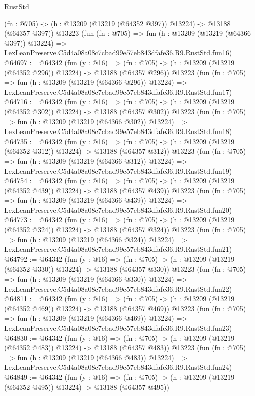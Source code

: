 \begin{lexlean}{RustStd}
\begin{coremodule}
    (fn : @705) -> (h : @13209 (@13219 (@64352 @397)) @13224) -> @13188 (@64357 @397))
    @13223
    (fun (fn : @705) =>
    fun (h : @13209 (@13219 (@64366 @397)) @13224) =>
    LexLeanPreserve.C5d4a08a08c7cbad99e57eb843dfafe36.R9.RustStd.fun16)
@64697 := @64342
    (fun (y : @16) =>
    (fn : @705) -> (h : @13209 (@13219 (@64352 @296)) @13224) -> @13188 (@64357 @296))
    @13223
    (fun (fn : @705) =>
    fun (h : @13209 (@13219 (@64366 @296)) @13224) =>
    LexLeanPreserve.C5d4a08a08c7cbad99e57eb843dfafe36.R9.RustStd.fun17)
@64716 := @64342
    (fun (y : @16) =>
    (fn : @705) -> (h : @13209 (@13219 (@64352 @302)) @13224) -> @13188 (@64357 @302))
    @13223
    (fun (fn : @705) =>
    fun (h : @13209 (@13219 (@64366 @302)) @13224) =>
    LexLeanPreserve.C5d4a08a08c7cbad99e57eb843dfafe36.R9.RustStd.fun18)
@64735 := @64342
    (fun (y : @16) =>
    (fn : @705) -> (h : @13209 (@13219 (@64352 @312)) @13224) -> @13188 (@64357 @312))
    @13223
    (fun (fn : @705) =>
    fun (h : @13209 (@13219 (@64366 @312)) @13224) =>
    LexLeanPreserve.C5d4a08a08c7cbad99e57eb843dfafe36.R9.RustStd.fun19)
@64754 := @64342
    (fun (y : @16) =>
    (fn : @705) -> (h : @13209 (@13219 (@64352 @439)) @13224) -> @13188 (@64357 @439))
    @13223
    (fun (fn : @705) =>
    fun (h : @13209 (@13219 (@64366 @439)) @13224) =>
    LexLeanPreserve.C5d4a08a08c7cbad99e57eb843dfafe36.R9.RustStd.fun20)
@64773 := @64342
    (fun (y : @16) =>
    (fn : @705) -> (h : @13209 (@13219 (@64352 @324)) @13224) -> @13188 (@64357 @324))
    @13223
    (fun (fn : @705) =>
    fun (h : @13209 (@13219 (@64366 @324)) @13224) =>
    LexLeanPreserve.C5d4a08a08c7cbad99e57eb843dfafe36.R9.RustStd.fun21)
@64792 := @64342
    (fun (y : @16) =>
    (fn : @705) -> (h : @13209 (@13219 (@64352 @330)) @13224) -> @13188 (@64357 @330))
    @13223
    (fun (fn : @705) =>
    fun (h : @13209 (@13219 (@64366 @330)) @13224) =>
    LexLeanPreserve.C5d4a08a08c7cbad99e57eb843dfafe36.R9.RustStd.fun22)
@64811 := @64342
    (fun (y : @16) =>
    (fn : @705) -> (h : @13209 (@13219 (@64352 @469)) @13224) -> @13188 (@64357 @469))
    @13223
    (fun (fn : @705) =>
    fun (h : @13209 (@13219 (@64366 @469)) @13224) =>
    LexLeanPreserve.C5d4a08a08c7cbad99e57eb843dfafe36.R9.RustStd.fun23)
@64830 := @64342
    (fun (y : @16) =>
    (fn : @705) -> (h : @13209 (@13219 (@64352 @483)) @13224) -> @13188 (@64357 @483))
    @13223
    (fun (fn : @705) =>
    fun (h : @13209 (@13219 (@64366 @483)) @13224) =>
    LexLeanPreserve.C5d4a08a08c7cbad99e57eb843dfafe36.R9.RustStd.fun24)
@64849 := @64342
    (fun (y : @16) =>
    (fn : @705) -> (h : @13209 (@13219 (@64352 @495)) @13224) -> @13188 (@64357 @495))

\end{coremodule}
\end{lexlean}
